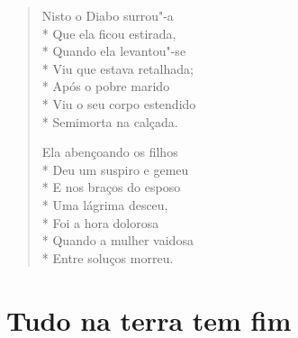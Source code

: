 \begin{verse}
Nisto o Diabo surrou"-a\\*
Que ela ficou estirada,\\*
Quando ela levantou"-se\\*
Viu que estava retalhada;\\*
Após o pobre marido\\*
Viu o seu corpo estendido\\*
Semimorta na calçada.

Ela abençoando os filhos\\*
Deu um suspiro e gemeu\\*
E nos braços do esposo\\*
Uma lágrima desceu,\\*
Foi a hora dolorosa\\*
Quando a mulher vaidosa\\*
Entre soluços morreu.
\end{verse}

\chapter{Tudo na terra tem fim}

